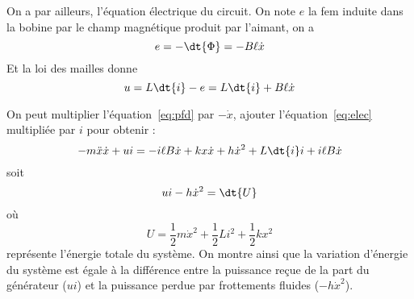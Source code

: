 \documentclass{cours}
\begin{document}
On a par ailleurs, l'équation électrique du circuit. On note $e$ la fem induite dans la bobine par le champ magnétique produit par l'aimant, on a 
\begin{equation}
  e = -\dt{\Phi} = -B\ell \dot{x}
\end{equation}
Et la loi des mailles donne 
\begin{equation}
  u = L \dt{i} -e = L \dt{i} + B \ell \dot{x} 
  \label{eq:elec}
\end{equation}

On peut multiplier l'équation~\ref{eq:pfd} par $-\dot{x} $, ajouter l'équation~\ref{eq:elec} multipliée par $i$ pour obtenir :
\begin{equation}
  -m \ddot{x} \dot{x} + ui  = -i\ell B \dot{x} + kx \dot{x} + h \dot{x}^2 + L \dt{i}i+i\ell B \dot{x}
\end{equation}
soit
\begin{equation}
  ui -h \dot{x}^2 = \dt{U}
\end{equation}
où
\begin{equation}
  U = \frac{1}{2} m \dot{x}^2 + \frac{1}{2}Li^2 + \frac{1}{2}k x^2  
\end{equation}
représente l'énergie totale du système. On montre ainsi que la variation d'énergie du système est égale à la différence entre la puissance reçue de la part du générateur ($ui$) et la puissance perdue par frottements fluides ($-h \dot{x}^2$).
\end{document}
